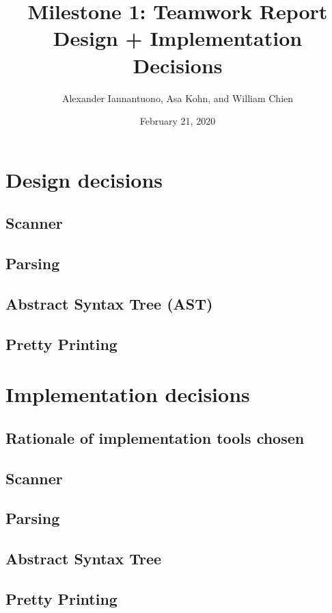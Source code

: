 \documentclass{article}
\title{
    Milestone 1: Teamwork Report\\
    \large Design + Implementation Decisions
}
\author{Alexander Iannantuono, Asa Kohn, and William Chien}
\date{February 21, 2020}
\begin{document}
\maketitle

\section{Design decisions}

\subsection{Scanner}

\subsection{Parsing}

\subsection{Abstract Syntax Tree (AST)}

\subsection{Pretty Printing}

\section{Implementation decisions}

\subsection{Rationale of implementation tools chosen}

\subsection{Scanner}

\subsection{Parsing}

\subsection{Abstract Syntax Tree}

\subsection{Pretty Printing}
\end{document}
